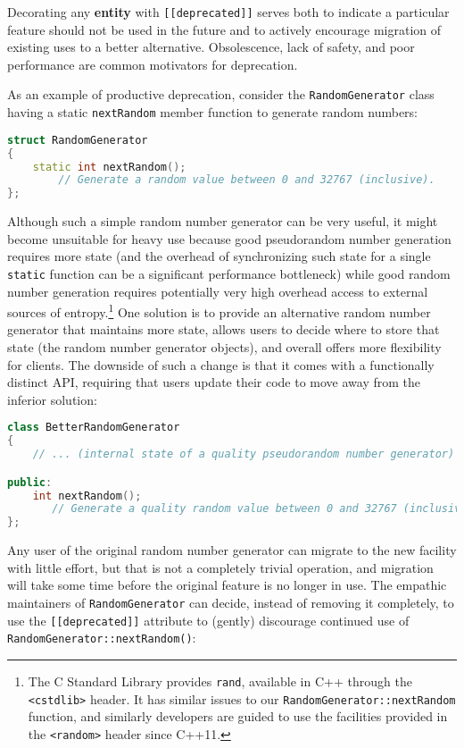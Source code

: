 Decorating any \textbf{entity} with \texttt{[[deprecated]]} serves both
to indicate a particular feature should not be used in the future and
to actively encourage migration of existing uses to a better
alternative. Obsolescence, lack of safety, and poor performance are
common motivators for deprecation.

As an example of productive deprecation, consider the
\texttt{RandomGenerator} class having a static \texttt{nextRandom}
member function to generate random numbers:

\begin{lstlisting}[language=C++]
struct RandomGenerator
{
    static int nextRandom();
        // Generate a random value between 0 and 32767 (inclusive).
};
\end{lstlisting}

\noindent Although such a simple random number generator can be very useful, it
might become unsuitable for heavy use because good pseudorandom number
generation requires more state (and the overhead of synchronizing such
state for a single \texttt{static} function can be a significant
performance bottleneck) while good random number generation requires
potentially very high overhead access to external sources of
entropy.{\cprotect\footnote{The C Standard Library provides
\texttt{rand}, available in C++ through the \texttt{<cstdlib>} header.
It has similar issues to our \texttt{RandomGenerator::nextRandom}
function, and similarly developers are guided to use the facilities
  provided in the \texttt{<random>} header since C++11.}} One
solution is to provide an alternative random number generator that
maintains more state, allows users to decide where to store that state
(the random number generator objects), and overall offers more
flexibility for clients. The downside of such a change is that it comes
with a functionally distinct API, requiring that users update their code
to move away from the inferior solution:

\begin{lstlisting}[language=C++]
class BetterRandomGenerator
{
    // ... (internal state of a quality pseudorandom number generator) ...

public:
    int nextRandom();
       // Generate a quality random value between 0 and 32767 (inclusive).
};
\end{lstlisting}

\noindent Any user of the original random number generator can migrate to the new
facility with little effort, but that is not a completely trivial
operation, and migration will take some time before the original feature is no
longer in use. The empathic maintainers of \texttt{RandomGenerator} can
decide, instead of removing it completely, to use the
\texttt{[[deprecated]]} attribute to (gently) discourage continued use
of \texttt{RandomGenerator::nextRandom()}:

